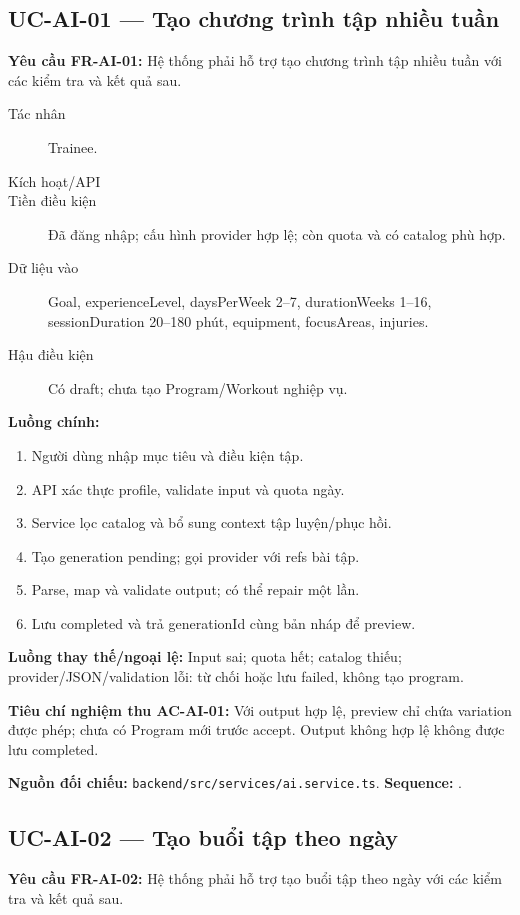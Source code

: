 \documentclass[12pt,a4paper]{article}
\newcommand{\evidence}[1]{{\small\nolinkurl{#1}}}
\begin{document}
\subsection{UC-AI-01 --- Tạo chương trình tập nhiều tuần}
\label{uc-ai-1}
\textbf{Yêu cầu FR-AI-01:} Hệ thống phải hỗ trợ tạo chương trình tập nhiều tuần với các kiểm tra và kết quả sau.

\begin{description}
\item[Tác nhân] Trainee.
\item[Kích hoạt/API] 
\item[Tiền điều kiện] Đã đăng nhập; cấu hình provider hợp lệ; còn quota và có catalog phù hợp.
\item[Dữ liệu vào] Goal, experienceLevel, daysPerWeek 2–7, durationWeeks 1–16, sessionDuration 20–180 phút, equipment, focusAreas, injuries.
\item[Hậu điều kiện] Có draft; chưa tạo Program/Workout nghiệp vụ.
\end{description}
\textbf{Luồng chính:}
\begin{enumerate}
  \item Người dùng nhập mục tiêu và điều kiện tập.
  \item API xác thực profile, validate input và quota ngày.
  \item Service lọc catalog và bổ sung context tập luyện/phục hồi.
  \item Tạo generation pending; gọi provider với refs bài tập.
  \item Parse, map và validate output; có thể repair một lần.
  \item Lưu completed và trả generationId cùng bản nháp để preview.
\end{enumerate}
\textbf{Luồng thay thế/ngoại lệ:} Input sai; quota hết; catalog thiếu; provider/JSON/validation lỗi: từ chối hoặc lưu failed, không tạo program.

\textbf{Tiêu chí nghiệm thu AC-AI-01:} Với output hợp lệ, preview chỉ chứa variation được phép; chưa có Program mới trước accept. Output không hợp lệ không được lưu completed.

\textbf{Nguồn đối chiếu:} \evidence{backend/src/services/ai.service.ts}. \textbf{Sequence:} .

\subsection{UC-AI-02 --- Tạo buổi tập theo ngày}
\label{uc-ai-2}
\textbf{Yêu cầu FR-AI-02:} Hệ thống phải hỗ trợ tạo buổi tập theo ngày với các kiểm tra và kết quả sau.
\end{document}
